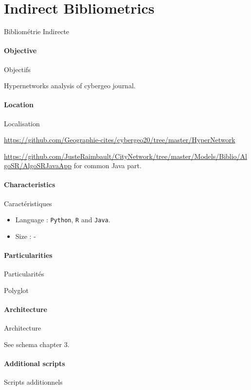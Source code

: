 

\section{Indirect Bibliometrics}{Bibliométrie Indirecte}

\paragraph{Objective}{Objectifs}

Hypernetworks analysis of cybergeo journal.

\paragraph{Location}{Localisation}

\url{https://github.com/Geographie-cites/cybergeo20/tree/master/HyperNetwork}

\url{https://github.com/JusteRaimbault/CityNetwork/tree/master/Models/Biblio/AlgoSR/AlgoSRJavaApp} for common Java part.

\paragraph{Characteristics}{Caractéristiques}

\begin{itemize}
\item Language : \texttt{Python}, \texttt{R} and \texttt{Java}.
\item Size : -
\end{itemize}


\paragraph{Particularities}{Particularités}

Polyglot 

\paragraph{Architecture}{Architecture}

See schema chapter 3.

\paragraph{Additional scripts}{Scripts additionnels}

